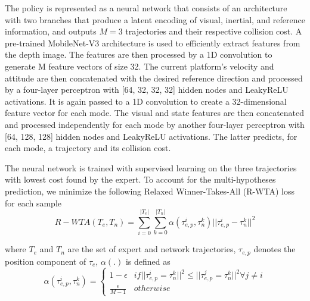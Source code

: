 The policy is represented as a neural network that consists of an architecture with two branches that produce a latent encoding of visual,
inertial, and reference information, and outputs $M = 3$ trajectories
and their respective collision cost. A pre-trained MobileNet-V3 architecture is used to efficiently extract features from the depth image. The features are then processed by a 1D convolution to generate
M feature vectors of size 32. The current platform’s velocity and
attitude are then concatenated with the desired reference direction
and processed by a four-layer perceptron with [64, 32, 32, 32] hidden
nodes and LeakyReLU activations. It is again passed to a 1D convolution to create a 32-dimensional feature vector for each mode. The visual
and state features are then concatenated and processed independently
 for each mode by another four-layer perceptron with [64, 128, 128]
hidden nodes and LeakyReLU activations. The latter predicts, for
each mode, a trajectory and its collision cost. 

The neural network is trained with supervised learning on the three trajectories with lowest cost found by the expert. To account for
the multi-hypotheses prediction, we minimize the following Relaxed Winner-Takes-All (R-WTA) loss for each sample
\begin{equation}
	R-WTA(T_e,T_n) = \sum^{|T_e|}_{i=0}\sum^{|T_n|}_{k=0} \alpha(\tau^i_{e,p},\tau^k_n)||\tau^i_{e,p}-\tau^k_n||^2
\end{equation}

where $T_e$ and $T_n$ are the set of expert and network trajectories, $\tau_{e,p}$ denotes the position component of $\tau_e$, $\alpha(.)$ is defined as 
\begin{equation}
	\alpha(\tau^i_{e,p}, \tau^k_n) = 
	\begin{cases}
		1-\epsilon & if ||\tau^i_{e,p}=\tau^k_n||^2 \le ||\tau^j_{e,p}=\tau^k_n||^2 \forall j \ne i \\
		\frac{\epsilon}{M-1} & otherwise
	\end{cases}
\end{equation}

